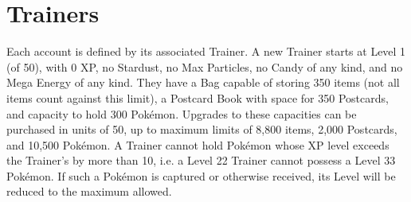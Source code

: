 \chapter{Trainers}
Each account is defined by its associated Trainer.
A new Trainer starts at Level 1 (of 50), with 0 XP, no Stardust, no Max Particles,
 no Candy of any kind, and no Mega Energy of any kind.
They have a Bag capable of storing 350 items (not all items count against this limit),
 a Postcard Book with space for 350 Postcards,
 and capacity to hold 300 Pokémon.
Upgrades to these capacities can be purchased in units of 50, up to maximum limits
 of 8,800 items, 2,000 Postcards, and 10,500 Pokémon.
A Trainer cannot hold Pokémon whose XP level exceeds the Trainer's
 by more than 10, i.e. a Level 22 Trainer cannot possess a Level 33
 Pokémon. If such a Pokémon is captured or otherwise received, its
 Level will be reduced to the maximum allowed.

